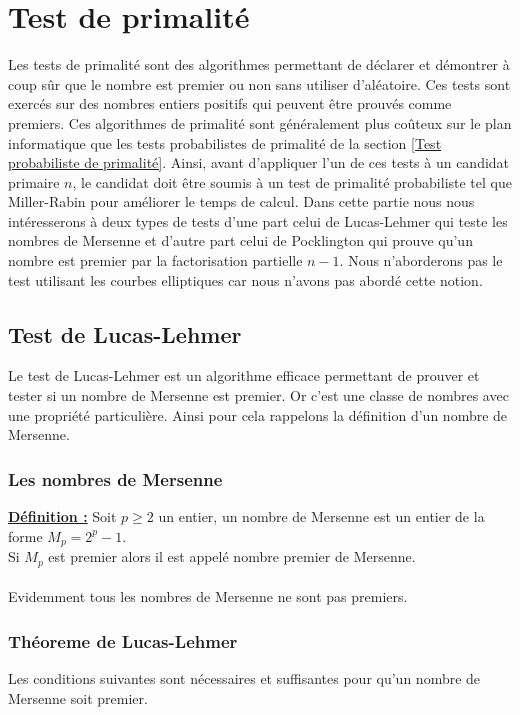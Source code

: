 \chapter{Test de primalité}
\label{Test de primalité}
Les tests de primalité sont des algorithmes permettant de déclarer et démontrer à coup sûr que le nombre est premier ou non sans utiliser d'aléatoire. Ces tests sont exercés sur des nombres entiers positifs qui peuvent être prouvés comme premiers. Ces algorithmes de primalité sont généralement plus coûteux sur le plan informatique que les tests probabilistes de primalité de la section \ref{Test probabiliste de primalité}. Ainsi, avant d’appliquer l’un de ces tests à un candidat primaire $n$, le candidat doit être soumis à un test de primalité probabiliste tel que Miller-Rabin pour améliorer le temps de calcul. Dans cette partie nous nous intéresserons à deux types de tests d'une part celui de Lucas-Lehmer qui teste les nombres de Mersenne et d'autre part celui de Pocklington qui prouve qu'un nombre est premier par la factorisation partielle $n-1$. Nous n'aborderons pas le test utilisant les courbes elliptiques car nous n'avons pas abordé cette notion.

\section{Test de Lucas-Lehmer}

Le test de Lucas-Lehmer est un algorithme efficace permettant de prouver et tester si un nombre de Mersenne est premier. Or c'est une classe de nombres avec une propriété particulière.
Ainsi pour cela rappelons la définition d'un nombre de Mersenne.

\subsection{Les nombres de Mersenne}

\underline{\textbf{Définition :}}
Soit  $p \geq 2$ un entier, un nombre de Mersenne est un entier de la forme $M_p=2^p -1$.\\
Si $M_p$ est premier alors il est appelé nombre premier de Mersenne.\\
\\
Evidemment tous les nombres de Mersenne ne sont pas premiers.
\subsection{Théoreme de Lucas-Lehmer}
Les conditions suivantes sont nécessaires et suffisantes pour qu’un nombre de Mersenne soit premier.

